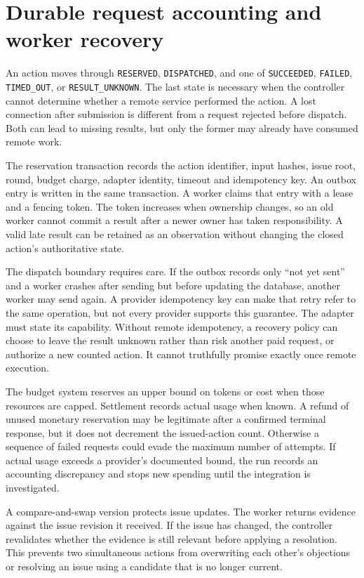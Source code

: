 \section{Durable request accounting and worker recovery}

An action moves through \texttt{RESERVED}, \texttt{DISPATCHED}, and one of
\texttt{SUCCEEDED}, \texttt{FAILED}, \texttt{TIMED\_OUT}, or
\texttt{RESULT\_UNKNOWN}. The last state is necessary when the controller cannot
determine whether a remote service performed the action. A lost connection after
submission is different from a request rejected before dispatch. Both can lead
to missing results, but only the former may already have consumed remote work.

The reservation transaction records the action identifier, input hashes, issue
root, round, budget charge, adapter identity, timeout and idempotency key. An
outbox entry is written in the same transaction. A worker claims that entry with
a lease and a fencing token. The token increases when ownership changes, so an
old worker cannot commit a result after a newer owner has taken responsibility.
A valid late result can be retained as an observation without changing the closed
action's authoritative state.

The dispatch boundary requires care. If the outbox records only ``not yet sent''
and a worker crashes after sending but before updating the database, another
worker may send again. A provider idempotency key can make that retry refer to the
same operation, but not every provider supports this guarantee. The adapter must
state its capability. Without remote idempotency, a recovery policy can choose to
leave the result unknown rather than risk another paid request, or authorize a
new counted action. It cannot truthfully promise exactly once remote execution.

The budget system reserves an upper bound on tokens or cost when those resources
are capped. Settlement records actual usage when known. A refund of unused
monetary reservation may be legitimate after a confirmed terminal response, but
it does not decrement the issued-action count. Otherwise a sequence of failed
requests could evade the maximum number of attempts. If actual usage exceeds a
provider's documented bound, the run records an accounting discrepancy and stops
new spending until the integration is investigated.

A compare-and-swap version protects issue updates. The worker returns evidence
against the issue revision it received. If the issue has changed, the controller
revalidates whether the evidence is still relevant before applying a resolution.
This prevents two simultaneous actions from overwriting each other's objections
or resolving an issue using a candidate that is no longer current.

